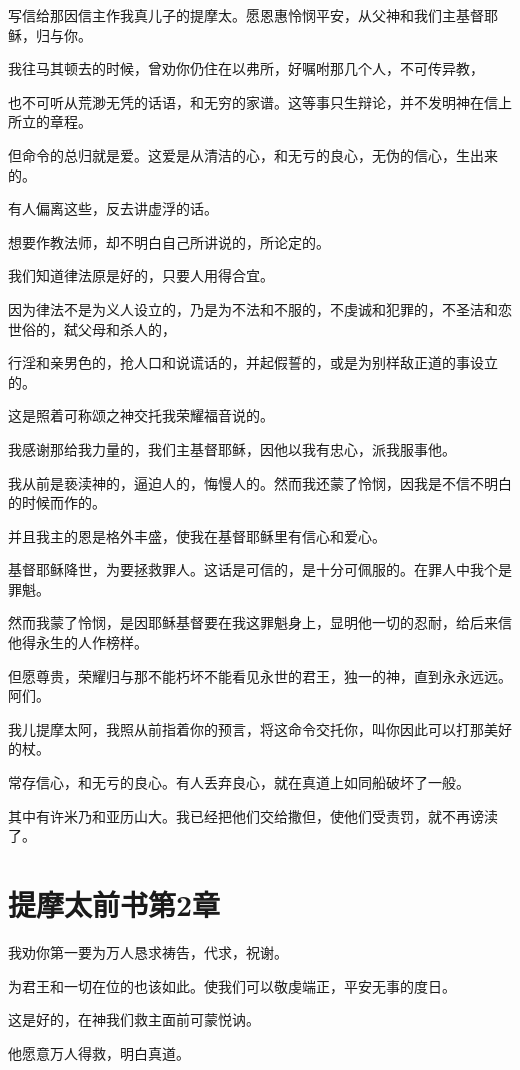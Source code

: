 \documentclass[12pt,oneside]{book}
\begin{document}
写信给那因信主作我真儿子的提摩太。愿恩惠怜悯平安，从父神和我们主基督耶稣，归与你。

我往马其顿去的时候，曾劝你仍住在以弗所，好嘱咐那几个人，不可传异教，

也不可听从荒渺无凭的话语，和无穷的家谱。这等事只生辩论，并不发明神在信上所立的章程。

但命令的总归就是爱。这爱是从清洁的心，和无亏的良心，无伪的信心，生出来的。

有人偏离这些，反去讲虚浮的话。

想要作教法师，却不明白自己所讲说的，所论定的。

我们知道律法原是好的，只要人用得合宜。

因为律法不是为义人设立的，乃是为不法和不服的，不虔诚和犯罪的，不圣洁和恋世俗的，弑父母和杀人的，

行淫和亲男色的，抢人口和说谎话的，并起假誓的，或是为别样敌正道的事设立的。

这是照着可称颂之神交托我荣耀福音说的。

我感谢那给我力量的，我们主基督耶稣，因他以我有忠心，派我服事他。

我从前是亵渎神的，逼迫人的，悔慢人的。然而我还蒙了怜悯，因我是不信不明白的时候而作的。

并且我主的恩是格外丰盛，使我在基督耶稣里有信心和爱心。

基督耶稣降世，为要拯救罪人。这话是可信的，是十分可佩服的。在罪人中我个是罪魁。

然而我蒙了怜悯，是因耶稣基督要在我这罪魁身上，显明他一切的忍耐，给后来信他得永生的人作榜样。

但愿尊贵，荣耀归与那不能朽坏不能看见永世的君王，独一的神，直到永永远远。阿们。

我儿提摩太阿，我照从前指着你的预言，将这命令交托你，叫你因此可以打那美好的杖。

常存信心，和无亏的良心。有人丢弃良心，就在真道上如同船破坏了一般。

其中有许米乃和亚历山大。我已经把他们交给撒但，使他们受责罚，就不再谤渎了。

\chapter{提摩太前书第2章}
我劝你第一要为万人恳求祷告，代求，祝谢。

为君王和一切在位的也该如此。使我们可以敬虔端正，平安无事的度日。

这是好的，在神我们救主面前可蒙悦讷。

他愿意万人得救，明白真道。
\end{document}
